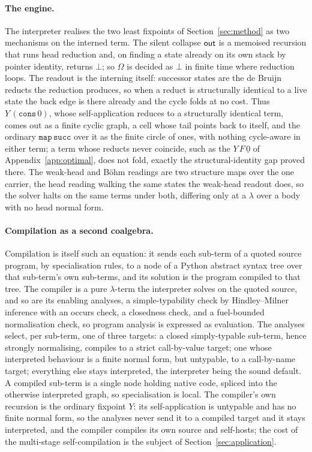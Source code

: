 \paragraph{The engine.}
The interpreter realises the two least fixpoints of Section~\ref{sec:method} as two mechanisms on
the interned term. The silent collapse $\mathsf{out}$ is a memoised recursion that runs head reduction
and, on finding a state already on its own stack by pointer identity, returns $\bot$; so $\Omega$
is decided as $\bot$ in finite time where reduction loops. The readout is the interning itself:
successor states are the de Bruijn reducts the reduction produces, so when a reduct is structurally
identical to a live state the back edge is there already and the cycle folds at no cost. Thus
$Y\,(\mathtt{cons}\,0)$, whose self-application reduces to a structurally identical term, comes out
as a finite cyclic graph, a cell whose tail points back to itself, and the ordinary
$\mathtt{map}\,\mathtt{succ}$ over it as the finite circle of ones, with nothing cycle-aware in
either term; a term whose reducts never coincide, such as the $Y\,F\,\underline{0}$ of
Appendix~\ref{app:optimal}, does not fold, exactly the structural-identity gap proved there. The
weak-head and B\"ohm readings are two structure maps over the one carrier, the head reading walking
the same states the weak-head readout does, so the solver halts on the same terms under both,
differing only at a $\lambda$ over a body with no head normal form.

\paragraph{Compilation as a second coalgebra.}
Compilation is itself such an equation: it sends each sub-term of a quoted source program, by
specialisation rules, to a node of a Python abstract syntax tree over that sub-term's own
sub-terms, and its solution is the program compiled to that tree. The compiler is a pure
$\lambda$-term the interpreter solves on the quoted source, and so are its enabling analyses, a
simple-typability check by Hindley--Milner inference with an occurs check, a closedness check, and
a fuel-bounded normalisation check, so program analysis is expressed as evaluation. The analyses
select, per sub-term, one of three targets: a closed simply-typable sub-term, hence strongly
normalising, compiles to a strict call-by-value target; one whose interpreted behaviour is a
finite normal form, but untypable, to a call-by-name target; everything else stays interpreted,
the interpreter being the sound default. A compiled sub-term is a single node holding native code,
spliced into the otherwise interpreted graph, so specialisation is local. The compiler's own
recursion is the ordinary fixpoint $Y$: its self-application is untypable and has no finite normal
form, so the analyses never send it to a compiled target and it stays interpreted, and the
compiler compiles its own source and self-hosts; the cost of the multi-stage self-compilation is the subject of
Section~\ref{sec:application}.

